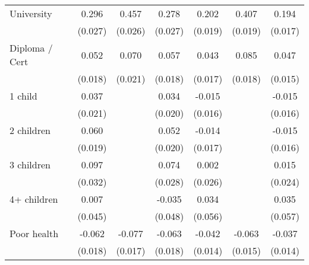 {\begin{tabular}{l*{6}{c}}
University          &       0.296\sym{***}&       0.457\sym{***}&       0.278\sym{***}&       0.202\sym{***}&       0.407\sym{***}&       0.194\sym{***}\\
                    &     (0.027)         &     (0.026)         &     (0.027)         &     (0.019)         &     (0.019)         &     (0.017)         \\
Diploma / Cert      &       0.052\sym{***}&       0.070\sym{***}&       0.057\sym{***}&       0.043\sym{**} &       0.085\sym{***}&       0.047\sym{***}\\
                    &     (0.018)         &     (0.021)         &     (0.018)         &     (0.017)         &     (0.018)         &     (0.015)         \\
1 child             &       0.037\sym{*}  &                     &       0.034\sym{*}  &      -0.015         &                     &      -0.015         \\
                    &     (0.021)         &                     &     (0.020)         &     (0.016)         &                     &     (0.016)         \\
2 children          &       0.060\sym{***}&                     &       0.052\sym{**} &      -0.014         &                     &      -0.015         \\
                    &     (0.019)         &                     &     (0.020)         &     (0.017)         &                     &     (0.016)         \\
3 children          &       0.097\sym{***}&                     &       0.074\sym{***}&       0.002         &                     &       0.015         \\
                    &     (0.032)         &                     &     (0.028)         &     (0.026)         &                     &     (0.024)         \\
4+ children         &       0.007         &                     &      -0.035         &       0.034         &                     &       0.035         \\
                    &     (0.045)         &                     &     (0.048)         &     (0.056)         &                     &     (0.057)         \\
Poor health         &      -0.062\sym{***}&      -0.077\sym{***}&      -0.063\sym{***}&      -0.042\sym{***}&      -0.063\sym{***}&      -0.037\sym{***}\\
                    &     (0.018)         &     (0.017)         &     (0.018)         &     (0.014)         &     (0.015)         &     (0.014)         \\

\end{tabular}}
